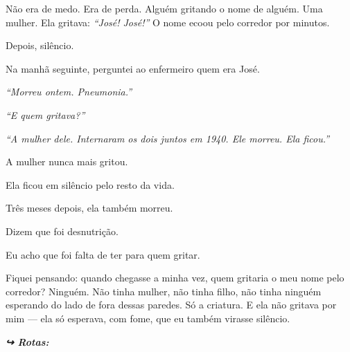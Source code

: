 \noindent Não era de medo. Era de perda. Alguém gritando o nome de alguém. Uma mulher. Ela gritava: \textit{\textquotedblleft{}José! José!\textquotedblright{}} O nome ecoou pelo corredor por minutos.

\noindent Depois, silêncio.

\noindent Na manhã seguinte, perguntei ao enfermeiro quem era José.

\noindent \textit{\textquotedblleft{}Morreu ontem. Pneumonia.\textquotedblright{}}

\noindent \textit{\textquotedblleft{}E quem gritava?\textquotedblright{}}

\noindent \textit{\textquotedblleft{}A mulher dele. Internaram os dois juntos em 1940. Ele morreu. Ela ficou.\textquotedblright{}}

\noindent A mulher nunca mais gritou.

\noindent Ela ficou em silêncio pelo resto da vida.

\noindent Três meses depois, ela também morreu.

\noindent Dizem que foi desnutrição.

\noindent Eu acho que foi falta de ter para quem gritar.

\noindent Fiquei pensando: quando chegasse a minha vez, quem gritaria o meu nome pelo corredor? Ninguém. Não tinha mulher, não tinha filho, não tinha ninguém esperando do lado de fora dessas paredes. Só a criatura. E ela não gritava por mim --- ela só esperava, com fome, que eu também virasse silêncio.

\vspace{0.5em}
\noindent\textit{\textbf{↪ Rotas:}  \rotasep {}}